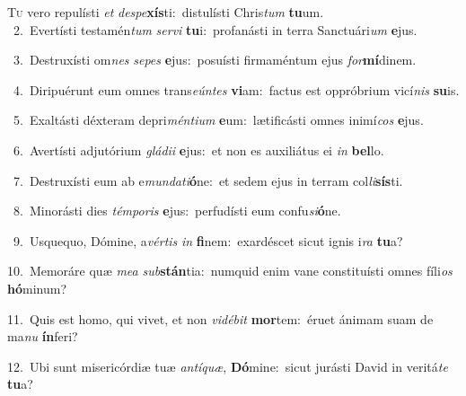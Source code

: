 \lettrine{\initial\textcolor{\initialcolor}{T}}{u} vero repulísti \textit{et} \textit{de}\-\textit{spe}\textbf{xís}ti:~\star distulísti Chris\textit{tum} \textbf{tu}\-um.\\
{\numbfont\textcolor{\numbcolor}{~2.}}~Evertísti testamén\textit{tum} \textit{ser}\-\textit{vi} \textbf{tu}\-i:~\star profanásti in terra Sanctuári\textit{um} \textbf{e}\-jus.\par
{\numbfont\textcolor{\numbcolor}{~3.}}~Destruxísti om\textit{nes} \textit{se}\-\textit{pes} \textbf{e}\-jus:~\star posuísti firmaméntum ejus \textit{for}\-\textbf{mí}dinem.\par
{\numbfont\textcolor{\numbcolor}{~4.}}~Diripuérunt eum omnes trans\-\textit{e}\-\textit{ún}\textit{tes} \textbf{vi}\-am:~\star factus est oppróbrium vicí\textit{nis} \textbf{su}\-is.\par
{\numbfont\textcolor{\numbcolor}{~5.}}~Exaltásti déxteram depri\-\textit{mén}\-\textit{ti}\textit{um} \textbf{e}\-um:~\star lætificásti omnes inimí\textit{cos} \textbf{e}\-jus.\par
{\numbfont\textcolor{\numbcolor}{~6.}}~Avertísti adjutórium \textit{glá}\-\textit{di}\textit{i} \textbf{e}\-jus:~\star et non es auxiliátus ei \textit{in} \textbf{bel}\-lo.\par
{\numbfont\textcolor{\numbcolor}{~7.}}~Destruxísti eum ab e\-\textit{mun}\-\textit{da}\textit{ti}\textbf{ó}ne:~\star et sedem ejus in terram col\-\textit{li}\-\textbf{sís}ti.\par
{\numbfont\textcolor{\numbcolor}{~8.}}~Minorásti dies \textit{tém}\-\textit{po}\textit{ris} \textbf{e}\-jus:~\star perfudísti eum confu\-\textit{si}\-\textbf{ó}ne.\par
{\numbfont\textcolor{\numbcolor}{~9.}}~Usquequo, Dómine, a\-\textit{vér}\-\textit{tis} \textit{in} \textbf{fi}\-nem:~\star exardéscet sicut ignis i\textit{ra} \textbf{tu}\-a?\par
{\numbfont\textcolor{\numbcolor}{10.}}~Memoráre quæ \textit{me}\-\textit{a} \textit{sub}\-\textbf{stán}tia:~\star numquid enim vane constituísti omnes fíli\textit{os} \textbf{hó}\-minum?\par
{\numbfont\textcolor{\numbcolor}{11.}}~Quis est homo, qui vivet, et non \textit{vi}\-\textit{dé}\textit{bit} \textbf{mor}\-tem:~\star éruet ánimam suam de ma\textit{nu} \textbf{ín}\-feri?\par
{\numbfont\textcolor{\numbcolor}{12.}}~Ubi sunt misericórdiæ tuæ \textit{an}\-\textit{tí}\textit{quæ}, \textbf{Dó}\-mine:~\star sicut jurásti David in veritá\textit{te} \textbf{tu}\-a?\par
